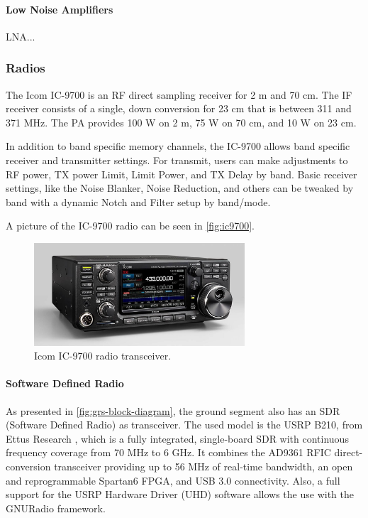 \paragraph{Low Noise Amplifiers}

LNA...

\subsubsection{Radios}

The Icom IC-9700 \cite{ic9700} is an RF direct sampling receiver for 2 m and 70 cm. The IF receiver consists of a single, down conversion for 23 cm that is between 311 and 371 MHz. The PA provides 100 W on 2 m, 75 W on 70 cm, and 10 W on 23 cm.

In addition to band specific memory channels, the IC-9700 allows band specific receiver and transmitter settings. For transmit, users can make adjustments to RF power, TX power Limit, Limit Power, and TX Delay by band. Basic receiver settings, like the Noise Blanker, Noise Reduction, and others can be tweaked by band with a dynamic Notch and Filter setup by band/mode.

A picture of the IC-9700 radio can be seen in \autoref{fig:ic9700}.

\begin{figure}[!ht]
    \begin{center}
        \includegraphics[width=0.7\textwidth]{figures/ic-9700.jpg}
        \caption{Icom IC-9700 radio transceiver.}
        \label{fig:ic9700}
    \end{center}
\end{figure}

\paragraph{Software Defined Radio}

As presented in \autoref{fig:grs-block-diagram}, the ground segment also has an SDR (Software Defined Radio) as transceiver. The used model is the USRP B210, from Ettus Research \cite{b210}, which is a fully integrated, single-board SDR with continuous frequency coverage from 70 MHz to 6 GHz. It combines the AD9361 RFIC direct-conversion transceiver providing up to 56 MHz of real-time bandwidth, an open and reprogrammable Spartan6 FPGA, and USB 3.0 connectivity. Also, a full support for the USRP Hardware Driver (UHD) software allows the use with the GNURadio framework.

